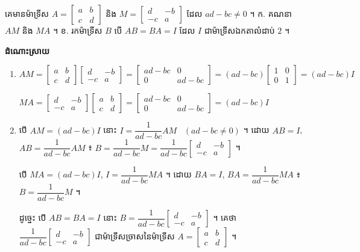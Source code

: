 \begin{example}[ឧទាហរណ៍ ២]
គេមានម៉ាទ្រីស $A = \begin{bmatrix} a & b\\ c & d \end{bmatrix}$ និង $M = \begin{bmatrix} d & -b\\ -c & a \end{bmatrix}$ ដែល $ad - bc \ne 0$ ។ \quad ក. គណនា $AM$ និង $MA$ ។ \quad ខ. រកម៉ាទ្រីស $B$ បើ $AB = BA = I$ ដែល $I$ ជាម៉ាទ្រីសឯកតាលំដាប់ $2$ ។

\textbf{ដំណោះស្រាយ}
\begin{enumerate}[a]
  \item $AM = \begin{bmatrix} a & b\\ c & d \end{bmatrix}\begin{bmatrix} d & -b\\ -c & a \end{bmatrix} = \begin{bmatrix} ad - bc & 0\\ 0 & ad - bc \end{bmatrix} = (ad - bc)\begin{bmatrix} 1 & 0\\ 0 & 1 \end{bmatrix} = (ad - bc)I$

  $MA = \begin{bmatrix} d & -b\\ -c & a \end{bmatrix}\begin{bmatrix} a & b\\ c & d \end{bmatrix} = \begin{bmatrix} ad - bc & 0\\ 0 & ad - bc \end{bmatrix} = (ad - bc)I$
  \item បើ $AM = (ad - bc)I$ នោះ $I = \dfrac{1}{ad - bc}AM$ \ $(ad - bc \ne 0)$ ។ ដោយ $AB = I$, $AB = \dfrac{1}{ad - bc}AM$ ៖ $B = \dfrac{1}{ad - bc}M = \dfrac{1}{ad - bc}\begin{bmatrix} d & -b\\ -c & a \end{bmatrix}$ ។

  បើ $MA = (ad - bc)I$, $I = \dfrac{1}{ad - bc}MA$ ។ ដោយ $BA = I$, $BA = \dfrac{1}{ad - bc}MA$ ៖ $B = \dfrac{1}{ad - bc}M$ ។

  ដូច្នេះ បើ $AB = BA = I$ នោះ $B = \dfrac{1}{ad - bc}\begin{bmatrix} d & -b\\ -c & a \end{bmatrix}$ ។ គេថា $\dfrac{1}{ad - bc}\begin{bmatrix} d & -b\\ -c & a \end{bmatrix}$ ជាម៉ាទ្រីសច្រាសនៃម៉ាទ្រីស $A = \begin{bmatrix} a & b\\ c & d \end{bmatrix}$ ។
\end{enumerate}
\end{example}

